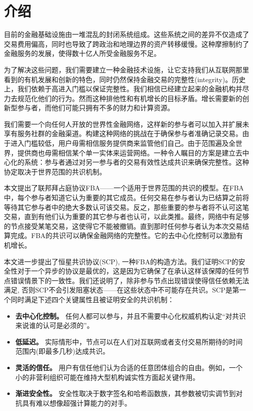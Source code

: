\section{介绍}

目前的金融基础设施由一堆混乱的封闭系统组成。这些系统之间的差异不仅造成了交易费用偏高，同时也导致了跨政治和地理边界的资产转移缓慢。这种摩擦制约了金融服务的发展，使得数十亿人所受金融服务不足。

为了解决这些问题，我们需要建立一种金融技术设施，让它支持我们从互联网那里看到的有机发展和创新的特色，同时仍然保持金融交易的完整性(integrity)。历史上，我们依赖于高进入门槛以保证完整性。我们相信已经建立起来的金融机构并尽力去规范化他们的行为。然而这种排他性和有机增长的目标矛盾。增长需要新的创新型参与者，而他们可能只拥有不多的财力和计算资源。

我们需要一个向任何人开放的世界性金融网络，这样新的参与者可以加入并扩展未享有服务社群的金融渠道。构建这种网络的挑战在于确保参与者准确记录交易。由于进入门槛较低，用户毋需相信服务提供商来监管他们自己。由于范围遍及全世界，提供商也毋需相信某个单一实体来运营网络。一种令人瞩目的方案是建立去中心化的系统：参与者通过对另一参与者的交易有效性达成共识来确保完整性。这种协定取决于世界范围的共识机制。

本文提出了联邦拜占庭协议FBA——一个适用于世界范围的共识的模型。在FBA中，每个参与者知道它认为重要的其它成员。任何交易在参与者认为已结算之前将等待其它参与者中的绝大多数认可该交易。反之，那些重要的参与者将不认可这笔交易，直到有他们认为重要的其它参与者也认可，以此类推。最终，网络中有足够的节点接受某笔交易，这使得它不能被撤销。直到那时任何参与者认为本次交易结算完成。FBA的共识可以确保金融网络的完整性。它的去中心化控制可以激励有机增长。

本文进一步提出了恒星共识协议(SCP), 一种FBA的构造方法。我们证明SCP的安全性对于一个异步的协议是最优的，这是因为它确保了在承认这样该保障的任何节点错误情景下的一致性。我们还说明了，除非参与节点出现错误使得信任依赖无法满足, 否则SCP不会引发阻塞状态——在这些状态中不可能存在共识。SCP是第一个同时满足下述四个关键属性且被证明安全的共识机制：

\begin{itemize}
	\item \textbf{去中心化控制。} 任何人都可以参与，并且不需要中心化权威机构认定``对共识来说谁的认可是必须的''。
	\item \textbf{低延迟。} 实际情形中，节点可以在人们对互联网或者支付交易所期待的时间范围内(即最多几秒)达成共识。
	\item \textbf{灵活的信任。} 用户有信任他们认为合适的任意团体组合的自由。例如，一个小的非营利组织可能在维持大型机构诚实性方面起关键作用。
	\item \textbf{渐进安全性。} 安全性取决于数字签名和哈希函数族，其参数被切实调节到对抗具有难以想像超强计算能力的对手。
\end{itemize}

